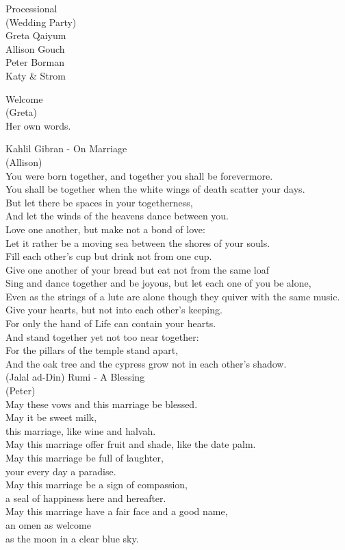 \documentclass[11pt]{article}
\newcommand*\ColText[1]{\textcolor{Goldenrod3}{#1}}
\newcommand*\heading[2]{%
    \vspace{2.0em}
    {\fontsize{24}{29}\selectfont\ColText{#1}}\\
    {\fontsize{14}{14}\selectfont\ColText{(#2)}}\\\vspace{2.0em}}
\begin{document}
\begin{center}
\heading{Processional}{Wedding Party}
Greta Qaiyum\\
Allison Gouch\\
Peter Borman\\
Katy \& Strom

\heading{Welcome}{Greta}
Her own words.

\pagebreak
\heading{Kahlil Gibran - On Marriage}{Allison}
You were born together, and together you shall be forevermore.\\
You shall be together when the white wings of death scatter your days.\\
But let there be spaces in your togetherness,\\
And let the winds of the heavens dance between you.\\
\vspace{2mm}
Love one another, but make not a bond of love:\\
Let it rather be a moving sea between the shores of your souls.\\
Fill each other's cup but drink not from one cup.\\
Give one another of your bread but eat not from the same loaf\\
Sing and dance together and be joyous, but let each one of you be alone,\\
Even as the strings of a lute are alone though they quiver with the same music.\\
\vspace{2mm}
Give your hearts, but not into each other's keeping.\\
For only the hand of Life can contain your hearts.\\
And stand together yet not too near together:\\
For the pillars of the temple stand apart,\\
And the oak tree and the cypress grow not in each other's shadow.\\

\pagebreak
\heading{(Jalal ad-Din) Rumi - A Blessing}{Peter}
May these vows and this marriage be blessed.\\
May it be sweet milk,\\
this marriage, like wine and halvah.\\
May this marriage offer fruit and shade, like the date palm.\\
May this marriage be full of laughter,\\
your every day a paradise.\\
May this marriage be a sign of compassion,\\
a seal of happiness here and hereafter.\\
May this marriage have a fair face and a good name,\\
an omen as welcome\\
as the moon in a clear blue sky.\\


\end{center}
\end{document}
